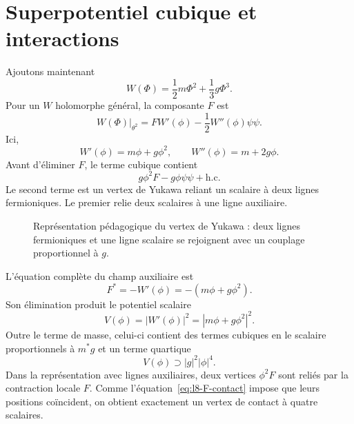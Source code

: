 \section{Superpotentiel cubique et interactions}

Ajoutons maintenant
\begin{equation}
W(\Phi)=\frac12m\Phi^2+\frac13g\Phi^3.
\label{eq:l8-superpotential}
\end{equation}
Pour un \(W\) holomorphe général, la composante \(F\) est
\begin{equation}
\left.W(\Phi)\right|_{\theta^2}
=F W'(\phi)-\frac12W''(\phi)\psi\psi.
\label{eq:l8-W-components}
\end{equation}
Ici,
\begin{equation}
W'(\phi)=m\phi+g\phi^2,
\qquad
W''(\phi)=m+2g\phi.
\end{equation}
Avant d’éliminer \(F\), le terme cubique contient
\begin{equation}
g\phi^2F-g\phi\psi\psi+\text{h.c.}
\label{eq:l8-cubic-offshell}
\end{equation}
Le second terme est un vertex de Yukawa reliant un scalaire à deux lignes fermioniques. Le premier relie deux scalaires à une ligne auxiliaire.

\begin{figure}[H]
\centering
{}
\caption{Représentation pédagogique du vertex de Yukawa : deux lignes fermioniques et une ligne scalaire se rejoignent avec un couplage proportionnel à \(g\).}
\end{figure}

L’équation complète du champ auxiliaire est
\begin{equation}
F^\ast=-W'(\phi)=-(m\phi+g\phi^2).
\label{eq:l8-general-F-equation}
\end{equation}
Son élimination produit le potentiel scalaire
\begin{equation}
V(\phi)=|W'(\phi)|^2
=|m\phi+g\phi^2|^2.
\label{eq:l8-scalar-potential}
\end{equation}
Outre le terme de masse, celui-ci contient des termes cubiques en le scalaire proportionnels à \(m^\ast g\) et un terme quartique
\begin{equation}
V(\phi)\supset |g|^2|\phi|^4.
\label{eq:l8-quartic}
\end{equation}
Dans la représentation avec lignes auxiliaires, deux vertices \(\phi^2F\) sont reliés par la contraction locale \(F\). Comme l’équation~\eqref{eq:l8-F-contact} impose que leurs positions coïncident, on obtient exactement un vertex de contact à quatre scalaires.

